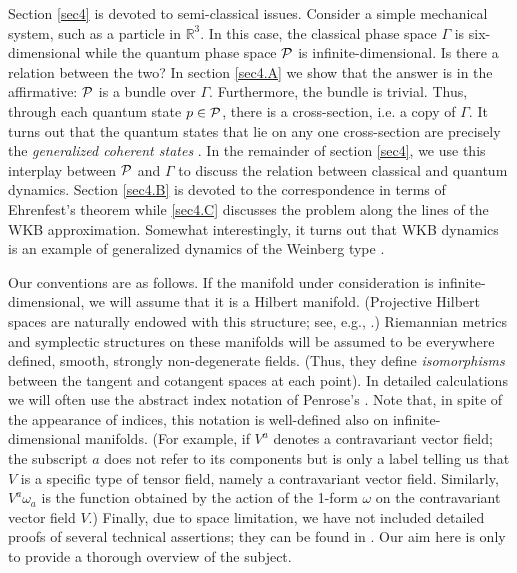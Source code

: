 \documentclass[12pt,aps,eqsecnum,tighten]{revtex4-2}
\def\P{{\cal P}}
\def\R{\mathbb R}
\begin{document}
Section \ref{sec4} is devoted to semi-classical issues. Consider a
simple mechanical system, such as a particle in $\R^3$. In this case,
the classical phase space $\Gamma$ is six-dimensional while the
quantum phase space $\P$ is infinite-dimensional. Is there a relation
between the two? In section \ref{sec4.A} we show that the answer is in
the affirmative: $\P$ is a bundle over $\Gamma$. Furthermore, the
bundle is trivial. Thus, through each quantum state $p\in \P$, there
is a cross-section, i.e. a copy of $\Gamma$. It turns out that the
quantum states that lie on any one cross-section are precisely the
{\it generalized coherent states} \cite{perelomov,gilmore,klauder}. In
the remainder of section \ref{sec4}, we use this interplay between
$\P$ and $\Gamma$ to discuss the relation between classical and
quantum dynamics.  Section \ref{sec4.B} is devoted to the
correspondence in terms of Ehrenfest's theorem while \ref{sec4.C}
discusses the problem along the lines of the WKB
approximation. Somewhat interestingly, it turns out that WKB dynamics
is an example of generalized dynamics of the Weinberg type
\cite{weinberg}.

Our conventions are as follows. If the manifold under consideration is
infinite-dimensional, we will assume that it is a Hilbert
manifold. (Projective Hilbert spaces are naturally endowed with this
structure; see, e.g., \cite{thesis}.) Riemannian metrics and
symplectic structures on these manifolds will be assumed to be
everywhere defined, smooth, strongly non-degenerate fields. (Thus,
they define {\it isomorphisms} between the tangent and cotangent
spaces at each point). In detailed calculations we will often use the
abstract index notation of Penrose's \cite{rp2,indices}.  Note that,
in spite of the appearance of indices, this notation is well-defined
also on infinite-dimensional manifolds. (For example, if $V^a$ denotes
a contravariant vector field; the subscript $a$ does not refer to its
components but is only a label telling us that $V$ is a specific type
of tensor field, namely a contravariant vector field. Similarly,
$V^a\omega_a$ is the function obtained by the action of the 1-form
$\omega$ on the contravariant vector field $V$.)  Finally, due to
space limitation, we have not included detailed proofs of several
technical assertions; they can be found in \cite{thesis}. Our aim here
is only to provide a thorough overview of the subject.
\end{document}
